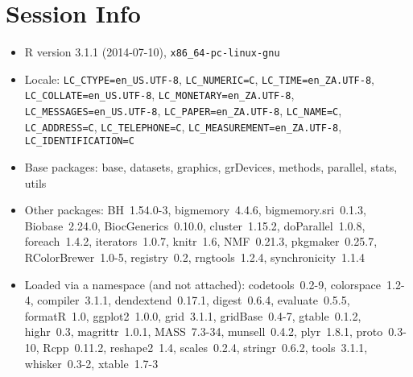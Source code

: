\documentclass[a4paper]{article}\usepackage[]{graphicx}\usepackage[]{color}
\begin{document}
\section{Session Info}
\begin{itemize}\raggedright
  \item R version 3.1.1 (2014-07-10), \verb|x86_64-pc-linux-gnu|
  \item Locale: \verb|LC_CTYPE=en_US.UTF-8|, \verb|LC_NUMERIC=C|, \verb|LC_TIME=en_ZA.UTF-8|, \verb|LC_COLLATE=en_US.UTF-8|, \verb|LC_MONETARY=en_ZA.UTF-8|, \verb|LC_MESSAGES=en_US.UTF-8|, \verb|LC_PAPER=en_ZA.UTF-8|, \verb|LC_NAME=C|, \verb|LC_ADDRESS=C|, \verb|LC_TELEPHONE=C|, \verb|LC_MEASUREMENT=en_ZA.UTF-8|, \verb|LC_IDENTIFICATION=C|
  \item Base packages: base, datasets, graphics, grDevices,
    methods, parallel, stats, utils
  \item Other packages: BH~1.54.0-3, bigmemory~4.4.6,
    bigmemory.sri~0.1.3, Biobase~2.24.0, BiocGenerics~0.10.0,
    cluster~1.15.2, doParallel~1.0.8, foreach~1.4.2,
    iterators~1.0.7, knitr~1.6, NMF~0.21.3, pkgmaker~0.25.7,
    RColorBrewer~1.0-5, registry~0.2, rngtools~1.2.4,
    synchronicity~1.1.4
  \item Loaded via a namespace (and not attached):
    codetools~0.2-9, colorspace~1.2-4, compiler~3.1.1,
    dendextend~0.17.1, digest~0.6.4, evaluate~0.5.5, formatR~1.0,
    ggplot2~1.0.0, grid~3.1.1, gridBase~0.4-7, gtable~0.1.2,
    highr~0.3, magrittr~1.0.1, MASS~7.3-34, munsell~0.4.2,
    plyr~1.8.1, proto~0.3-10, Rcpp~0.11.2, reshape2~1.4,
    scales~0.2.4, stringr~0.6.2, tools~3.1.1, whisker~0.3-2,
    xtable~1.7-3
\end{itemize}


\printbibliography[heading=bibintoc]
\end{document}
